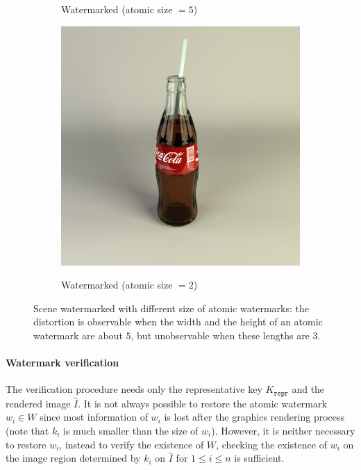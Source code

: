 \documentclass[a4paper,11pt,onecolumn]{memoir}
\begin{document}
\begin{figure}[ht]
\begin{subfigure}[b]{0.45\textwidth}
        \label{subfig:coca_cola_wm_ko}
        \caption{Watermarked (atomic size $= 5$)}
    \end{subfigure}
    \vfill
    \begin{subfigure}[b]{0.45\textwidth}
        \includegraphics[width=\textwidth]{coca_cola_wm_ok.png}
        \label{subfig:coca_cola_wm_ok}
        \caption{Watermarked (atomic size $= 2$)}
    \end{subfigure}
    \caption[Scene watermarked with different sizes of atomic watermarks]{Scene watermarked with different size of atomic watermarks: the distortion is observable when the width and the height of an atomic watermark are about $5$, but unobservable when these lengths are $3$.}
    \label{fig:coca_cola}
\end{figure}

\paragraph[Watermark verification]{Watermark verification}
The verification procedure needs only the representative key $K_\mathtt{repr}$ and the rendered image $\hat{I}$. It is not always possible to restore the atomic watermark $w_i \in W$ since most information of $w_i$ is lost after the graphics rendering process (note that $k_i$ is much smaller than the size of $w_i$). However, it is neither necessary to restore $w_i$, instead to verify the existence of $W$, checking the existence of $w_i$ on the image region determined by $k_i$ on $\hat{I}$ for $1 \leq i \leq n$ is sufficient.
\end{document}
